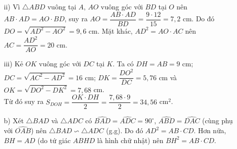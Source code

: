 \begin{bt}
{
\hspace*{-18pt}\begin{enumerate}
		\item[ii)] Vì $\triangle ABD$ vuông tại $A$, $AO$ vuông góc với $BD$ tại $O$ nên $AB\cdot AD=AO\cdot BD$, suy ra $AO=\dfrac{AB\cdot AD}{BD}=\dfrac{9\cdot 12}{15}=7,\!2$ cm.
		Do đó $DO=\sqrt{AD^2-AO^2}=9,\!6$ cm. Mặt khác, $AD^2=AO\cdot AC$ nên $AC=\dfrac{AD^2}{AO}=20$ cm.
		\item[iii)]  Kẻ $OK$ vuông góc với $DC$ tại $K$. Ta có $DH=AB=9$ cm; $DC=\sqrt{AC^2-AD^2}=16$ cm; $DK=\dfrac{DO^2}{DC}=5,\!76$ cm và $OK=\sqrt{DO^2-DK^2}=7,\!68$ cm.\\
		Từ đó suy ra $S_{DOH}=\dfrac{OK\cdot DH}{2}=\dfrac{7,\!68\cdot 9}{2}=34,\!56$ cm$^2$.
	\item[b)] Xét $\triangle BAD$ và $\triangle ADC$ có $\widehat{BAD}=\widehat{ADC}=90^\circ$, $\widehat{ABD}=\widehat{DAC}$ (cùng phụ với $\widehat{OAB}$) nên $\triangle BAD\backsim\triangle ADC$ (g.g). Do đó $AD^2=AB\cdot CD$. Hơn nữa, $BH=AD$ (do tứ giác $ABHD$ là hình chữ nhật) nên $BH^2=AB\cdot CD$.
\end{enumerate}}
\end{bt}
	
